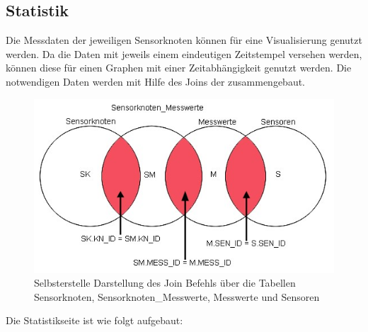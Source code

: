 \newpage
\subsection{Statistik}\label{Statistik}
	Die Messdaten der jeweiligen Sensorknoten können für eine Visualisierung genutzt werden. Da die Daten mit jeweils einem eindeutigen Zeitstempel versehen werden, können diese für einen Graphen mit einer Zeitabhängigkeit genutzt werden. Die notwendigen Daten werden mit Hilfe des Joins der  zusammengebaut.
	\begin{figure}[htp]
		\includegraphics[width=\textwidth]{Bilder/Kapitel4/uebersichtjoin.jpg}
		\caption[Mengendarstellung der Übersichtsseite]{Selbsterstelle Darstellung des Join Befehls über die Tabellen Sensorknoten, Sensorknoten\_Messwerte, Messwerte und Sensoren}
		\label{fig:Kapitel4/uebersichtjoin.jpg1}
	\end{figure}
	Die Statistikseite ist wie folgt aufgebaut:
